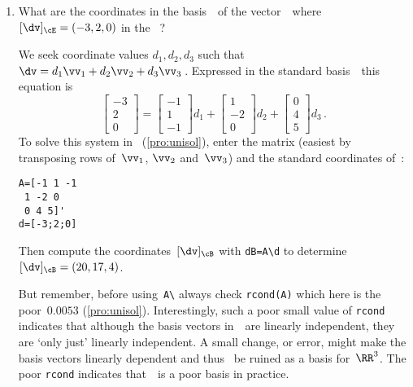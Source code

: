\begin{example}
\begin{enumerate}
\item What are the coordinates in the basis~\cB\ of the vector~\dv\ where \([\dv]_\cE=(-3,2,0)\) in the ~\cE?
\begin{solution} 
We seek coordinate values \(d_1,d_2,d_3\) such that \(\dv=d_1\vv_1+d_2\vv_2+d_3\vv_3\)\,. 
Expressed in the standard basis~\cE\ this equation is
\begin{equation*}
\begin{bmatrix} -3\\2\\0 \end{bmatrix}=
\begin{bmatrix} -1\\1\\-1 \end{bmatrix}d_1+
\begin{bmatrix} 1\\-2\\0 \end{bmatrix}d_2+
\begin{bmatrix} 0\\4\\5 \end{bmatrix}d_3\,.
\end{equation*}
To solve this system in \script\ (\autoref{pro:unisol}), enter the matrix (easiest by transposing rows of~\(\vv_1\), \(\vv_2\) and~\(\vv_3\)) and the standard coordinates of~\dv:
\begin{verbatim}
A=[-1 1 -1
 1 -2 0
 0 4 5]'
d=[-3;2;0]
\end{verbatim}
\setbox\ajrqrbox\hbox{}%
\marginpar{\usebox{\ajrqrbox}}%
Then compute the coordinates~\([\dv]_\cB\) with \verb|dB=A\d| to determine \([\dv]_\cB=(20,17,4)\).

But remember, before using~\verb|A\| always check \verb|rcond(A)| which here is the poor~\(0.0053\) (\autoref{pro:unisol}).
Interestingly, such a poor small value of \verb|rcond| indicates that although the basis vectors in~\cB\ are linearly independent, they are `only just' linearly independent.
A small change, or error, might make the basis vectors linearly dependent and thus \cB~be ruined as a basis for~\(\RR^3\).
The poor \verb|rcond| indicates that~\cB\ is a poor basis in practice.
\end{solution}
\end{enumerate}
\end{example}





